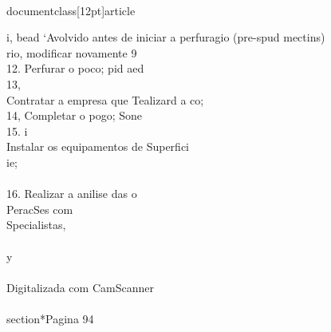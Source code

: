 \\documentclass[12pt]{article}
\begin{document}
i, bead ‘Avolvido antes de iniciar a perfuragio (pre-spud mectins)\\
rio, modificar novamente 9\\
12. Perfurar o poco; pid aed\\
13,\\
Contratar a empresa que Tealizard a co;\\
14, Completar o pogo; Sone\\
15. i\\
Instalar os equipamentos de Superfici\\
ie;\\
\\
16. Realizar a anilise das o\\
PeracSes com\\
Specialistas,\\
\\
y\\
\\
Digitalizada com CamScanner\\

\\section*{Pagina 94}
\end{document}
